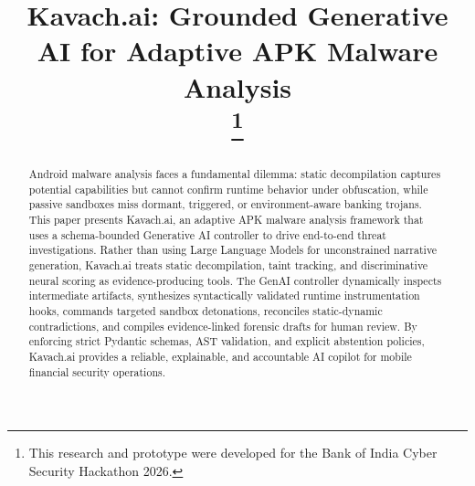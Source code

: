 \documentclass[conference]{IEEEtran}
\begin{document}
\title{Kavach.ai: Grounded Generative AI for Adaptive APK Malware Analysis\\
\thanks{This research and prototype were developed for the Bank of India Cyber Security Hackathon 2026.}
}

\author{
\and
{}
\and
{}
\and
{}
}

\maketitle

\begin{abstract}
Android malware analysis faces a fundamental dilemma: static decompilation captures potential capabilities but cannot confirm runtime behavior under obfuscation, while passive sandboxes miss dormant, triggered, or environment-aware banking trojans. This paper presents Kavach.ai, an adaptive APK malware analysis framework that uses a schema-bounded Generative AI controller to drive end-to-end threat investigations. Rather than using Large Language Models for unconstrained narrative generation, Kavach.ai treats static decompilation, taint tracking, and discriminative neural scoring as evidence-producing tools. The GenAI controller dynamically inspects intermediate artifacts, synthesizes syntactically validated runtime instrumentation hooks, commands targeted sandbox detonations, reconciles static-dynamic contradictions, and compiles evidence-linked forensic drafts for human review. By enforcing strict Pydantic schemas, AST validation, and explicit abstention policies, Kavach.ai provides a reliable, explainable, and accountable AI copilot for mobile financial security operations.
\end{abstract}
\end{document}
